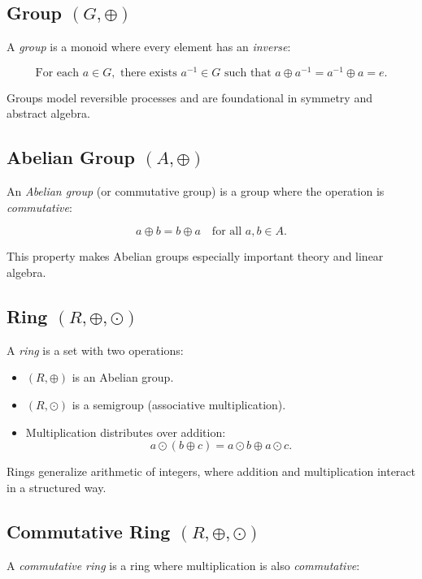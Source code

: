 \subsection{Group \texorpdfstring{\((G, \oplus)\)}{}}

A \emph{group} is a monoid where every element has an \emph{inverse}:

\[
\text{For each } a \in G, \text{ there exists } a^{-1} \in G \text{ such that } a \oplus a^{-1} = a^{-1} \oplus a = e.
\]

Groups model reversible processes and are foundational in symmetry and abstract algebra.

\subsection{Abelian Group \texorpdfstring{\((A, \oplus)\)}{}}

An \emph{Abelian group} (or commutative group) is a group where the operation is \emph{commutative}:

\[
a \oplus b = b \oplus a \quad \text{for all } a, b \in A.
\]

This property makes Abelian groups especially important theory and linear algebra.

\subsection{Ring \texorpdfstring{\((R, \oplus, \odot)\)}{}}

A \emph{ring} is a set with two operations:

\begin{itemize}[label=\(-\)]
  \item \((R, \oplus)\) is an Abelian group.
  \item \((R, \odot)\) is a semigroup (associative multiplication).
  \item Multiplication distributes over addition:
  \[
  a \odot (b \oplus c) = a \odot b \oplus a \odot c.
  \]
\end{itemize}

Rings generalize arithmetic of integers, where addition and multiplication interact in a structured way.

\subsection{Commutative Ring \texorpdfstring{\((R, \oplus, \odot)\)}{}}

A \emph{commutative ring} is a ring where multiplication is also \emph{commutative}:

